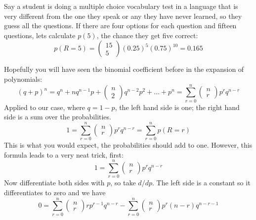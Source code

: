 \documentclass[11pt,a4paper]{scrartcl}
\begin{document}
Say a student is doing a multiple choice vocabulary test in a language
that is very different from the one they speak or any they have never
learned, so they guess all the questions. If there are four options
for each question and fifteen questions, lets calculate $p(5)$, the
chance they get five correct:
\begin{equation}
p(R=5)=\left(\begin{array}{c}15\\5\end{array}\right)(0.25)^5(0.75)^{10}=0.165
\end{equation}

Hopefully you will have seen the binomial coefficient before in the
expansion of polynomials:
\begin{equation}
(q+p)^n=q^n+nq^{n-1}p+\left(\begin{array}{c}n\\2\end{array}\right)q^{n-2}p^2+\ldots+p^n=\sum_{r=0}^n \left(\begin{array}{c}n\\r\end{array}\right)p^rq^{n-r}
\end{equation}
Applied to our case, where $q=1-p$, the left hand side is one; the right hand side is a sum over the probabilities.
\begin{equation}
1=\sum_{r=0}^n \left(\begin{array}{c}n\\r\end{array}\right)p^rq^{n-r}=\sum_{r=0}^np(R=r)
\end{equation}
This is what you would expect, the probabilities should add to
one. However, this formula leads to a very neat trick, first:
\begin{equation}
1=\sum_{r=0}^n \left(\begin{array}{c}n\\r\end{array}\right)p^rq^{n-r}
\end{equation}
Now differentiate both sides with $p$, so take $d/dp$. The left side is a constant so it differentiates to zero and we have
\begin{equation}
0=\sum_{r=0}^n
\left(\begin{array}{c}n\\r\end{array}\right)rp^{r-1}q^{n-r}-\sum_{r=0}^n
  \left(\begin{array}{c}n\\r\end{array}\right)p^r(n-r)q^{n-r-1}
\end{equation}
\end{document}
